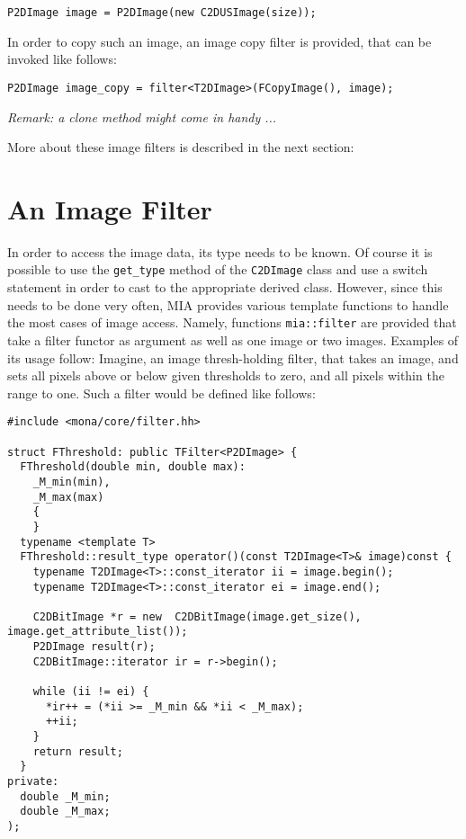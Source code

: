 \documentclass[english, 10pt, a4paper,headsepline,openany]{scrbook}
\begin{document}
\begin{lstlisting}
P2DImage image = P2DImage(new C2DUSImage(size)); 
\end{lstlisting}
 
In order to copy such an image, an image copy filter is provided, that can be invoked like follows: 

\begin{lstlisting}
P2DImage image_copy = filter<T2DImage>(FCopyImage(), image); 
\end{lstlisting}
\emph{Remark: a clone method might come in handy ...}

More about these image filters is described in the next section: 

\section{An Image Filter}
\label{sec:filter}

In order to access the image data, its type needs to be known. 
Of course it is possible to use the \texttt{get\_type} method of the \texttt{C2DImage} class and use
  a switch statement in order to cast to the appropriate derived class. 
However, since this needs to be done very often, MIA provides various template functions to handle the most cases
  of image access. 
Namely, functions \texttt{mia::filter} are provided that take a filter functor as argument as well as one image or two images. 
Examples of its usage follow: 
Imagine, an image thresh-holding filter, that takes an image, and sets all pixels above or below given thresholds to zero, and 
  all pixels within the range to one. 
Such a filter would be defined like follows:     

\lstset{language=c++,numbers=left}	
\begin{lstlisting}
#include <mona/core/filter.hh>

struct FThreshold: public TFilter<P2DImage> {
  FThreshold(double min, double max):
    _M_min(min), 
    _M_max(max)
    {
    }
  typename <template T> 
  FThreshold::result_type operator()(const T2DImage<T>& image)const {
    typename T2DImage<T>::const_iterator ii = image.begin(); 
    typename T2DImage<T>::const_iterator ei = image.end();
    
    C2DBitImage *r = new  C2DBitImage(image.get_size(), image.get_attribute_list()); 
    P2DImage result(r); 
    C2DBitImage::iterator ir = r->begin();
    
    while (ii != ei) {
      *ir++ = (*ii >= _M_min && *ii < _M_max); 
      ++ii; 
    }
    return result;     
  }
private: 
  double _M_min; 
  double _M_max; 
); 
\end{lstlisting}
\end{document}
